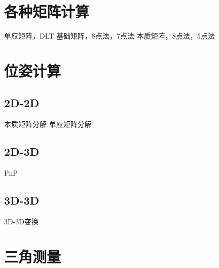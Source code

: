 \section{各种矩阵计算}






单应矩阵，DLT
基础矩阵，8点法，7点法
本质矩阵，8点法，5点法

\section{位姿计算}
\subsection{2D-2D}
本质矩阵分解
单应矩阵分解
\subsection{2D-3D}
PnP
\subsection{3D-3D}
3D-3D变换

\section{三角测量}

